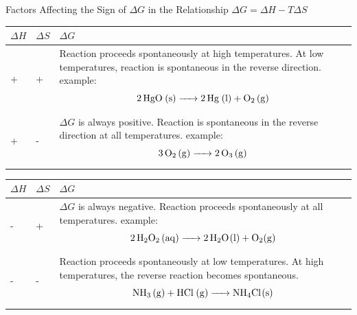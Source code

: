\documentclass[a4paper,12pt,twocolumn]{article}
\begin{document}
{\large Factors Affecting the Sign of $\Delta G$ in the Relationship $\Delta G = \Delta H - T\Delta S$}
\begin{table}[h]
\centering
\def\arraystretch{1.5}
\begin{tabular} {|l|l|p{2.3in}|}
\hline
$\Delta H$ & $\Delta S$ & $\Delta G$ \\ \hline
+ & + & Reaction proceeds spontaneously at high temperatures. At low temperatures, reaction is spontaneous in the reverse direction. example: $$\ce{2HgO (s) -> 2Hg (l) + O2 (g)}$$ \\ \hline
+ & - & $\Delta G$ is always positive. Reaction is spontaneous in the reverse direction at all temperatures. example: $$\ce{3O2 (g) -> 2O3 (g)}$$ \\ \hline

\end{tabular}
\end{table}

\begin{table}[h]
\centering
\def\arraystretch{1.5}
\begin{tabular} {|l|l|p{2.3in}|}
\hline
$\Delta H$ & $\Delta S$ & $\Delta G$ \\ \hline
- & + & $\Delta G$ is always negative. Reaction proceeds spontaneously at all temperatures. example: $$\ce{2H2O2 (aq) -> 2H2O(l) + O2(g)}$$ \\ \hline
- & - & Reaction proceeds spontaneously at low temperatures. At high temperatures, the reverse reaction becomes spontaneous.  $$\ce{NH3 (g) + HCl (g) -> NH4Cl(s)}$$\\ \hline
\end{tabular}
\end{table}
\end{document}
